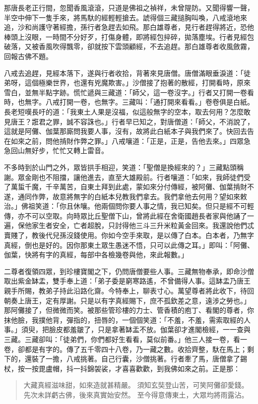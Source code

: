 那唐長老正行間，忽聞香風滾滾，只道是佛祖之禎祥，未曾隄防。又聞得響一聲，半空中伸下一隻手來，將馬馱的經輕輕搶去。諕得個三藏搥胸叫喚，八戒滾地來追，沙和尚護守著經擔，孫行者急趕去如飛。那白雄尊者，見行者趕得將近，恐他棒頭上沒眼，一時間不分好歹，打傷身體，即將經包捽碎，拋落塵埃。行者見經包破落，又被香風吹得飄零，卻就按下雲頭顧經，不去追趕。那白雄尊者收風斂霧，回報古佛不題。

八戒去追趕，見經本落下，遂與行者收拾，背著來見唐僧。唐僧滿眼垂淚道：「徒弟呀，這個極樂世界，也還有兇魔欺害。」沙僧接了抱著的散經，打開看時，原來雪白，並無半點字跡。慌忙遞與三藏道：「師父，這一卷沒字。」行者又打開一卷看時，也無字。八戒打開一卷，也無字。三藏叫：「通打開來看看。」卷卷俱是白紙。長老短嘆長吁的道：「我東土人果是沒福，似這般無字的空本，取去何用？怎麼敢見唐王？誑君之罪，誠不容誅也。」行者早已知之，對唐僧道：「師父，不消說了，這就是阿儺、伽葉那廝問我要人事，沒有，故將此白紙本子與我們來了。快回去告在如來之前，問他掯財作弊之罪。」八戒嚷道：「正是，正是，告他去來。」四眾急急回山無好步，忙忙又轉上雷音。

不多時到於山門之外，眾皆拱手相迎，笑道：「聖僧是換經來的？」三藏點頭稱謝。眾金剛也不阻擋，讓他進去，直至大雄殿前。行者嚷道：「如來，我師徒們受了萬蜇千魔，千辛萬苦，自東土拜到此處，蒙如來分付傳經，被阿儺、伽葉掯財不遂，通同作弊，故意將無字的白紙本兒教我們拿去。我們拿他去何用？望如來敕治。」佛祖笑道：「你且休嚷。他兩個問你要人事之情，我已知矣。但只是經不可輕傳，亦不可以空取。向時眾比丘聖僧下山，曾將此經在舍衛國趙長者家與他誦了一遍，保他家生者安全，亡者超脫，只討得他三斗三升米粒黃金回來。我還說他們忒賣賤了，教後代兒孫沒錢使用。你如今空手來取，是以傳了白本。白本者，乃無字真經，倒也是好的。因你那東土眾生愚迷不悟，只可以此傳之耳。」即叫：「阿儺、伽葉，快將有字的真經，每部中各檢幾卷與他，來此報數。」

二尊者復領四眾，到珍樓寶閣之下，仍問唐僧要些人事。三藏無物奉承，即命沙僧取出紫金缽盂，雙手奉上道：「弟子委是窮寒路遙，不曾備得人事。這缽盂乃唐王親手所賜，教弟子持此沿路化齋。今特奉上，聊表寸心。萬望尊者將此收下，待回朝奏上唐王，定有厚謝。只是以有字真經賜下，庶不孤欽差之意，遠涉之勞也。」那阿儺接了，但微微而笑。被那些管珍樓的力士、管香積的庖丁、看閣的尊者，你抹他臉，我撲他背，彈指的，扭唇的，一個個笑道：「不羞，不羞，需索取經的人事。」須臾，把臉皮都羞皺了，只是拿著缽盂不放。伽葉卻才進閣檢經，一一查與三藏。三藏卻叫：「徒弟們，你們都好生看看，莫似前番。」他三人接一卷，看一卷，卻都是有字的。傳了五千零四十八卷，乃一藏之數。收拾齊整，馱在馬上；剩下的，還裝了一擔，八戒挑著。自己行囊，沙僧挑著。行者牽了馬，唐僧拿了錫杖，按一按毘盧帽，抖一抖錦袈裟，才喜喜歡歡，到我佛如來之前。正是那：
\begin{quote}
大藏真經滋味甜，如來造就甚精嚴。
須知玄奘登山苦，可笑阿儺卻愛錢。
先次未詳虧古佛，後來真實始安然。
至今得意傳東土，大眾均將雨露沾。
\end{quote}


